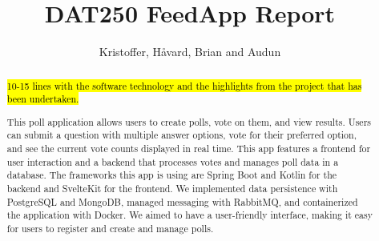 \documentclass[11pt]{article}
\begin{document}
\title{DAT250 FeedApp Report}

\author{Kristoffer, Håvard, Brian and Audun}

\maketitle

\begin{abstract}

\hl{10-15 lines with the software technology and the highlights from the project that has been undertaken.}



 This poll application allows users to create polls, vote on them, and view results. Users can submit a question with multiple answer options, vote for their preferred option, and see the current vote counts displayed in real time. This app features a frontend for user interaction and a backend that processes votes and manages poll data in a database.  The frameworks this app is using are Spring Boot and Kotlin for the backend and SvelteKit for the frontend. We implemented data persistence with PostgreSQL and MongoDB, managed messaging with RabbitMQ, and containerized the application with Docker. We aimed to have a user-friendly interface, making it easy for users to register and create and manage polls.
  

  

\end{abstract}

%
















\end{document}
